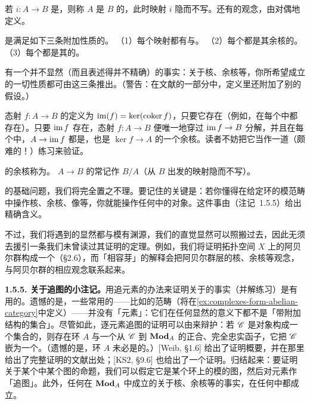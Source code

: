 若 $i\colon A\to B$ 是\trMonomorphism，则称 $A$ 是 $B$ 的\trSubobject，此时映射 $i$ 隐而不写。还有\trQuotientObject{}的观念，由\trSubobject{}对偶地定义。

\trAbelianCategory{}是满足如下三条附加性质的\trAdditiveCategory。
（1）每个映射都有\trKernel{}与\trCokernel。
（2）每个\trMonomorphism{}都是其余核的\trKernel。
（3）每个\trEpimorphism{}都是其\trKernel{}的\trCokernel。

有一个并不显然（而且表述得并不精确）的事实：关于核、余核等，你所希望成立的一切性质都可由这三条推出。（警告：在文献的一部分中，定义里还附加了别的假设。）

态射 $f\colon A\to B$ 的\trImage{}定义为 $\operatorname{im}(f)=\ker(\operatorname{coker} f)$，只要它存在（例如，在每个\trAbelianCategory{}中都存在）。只要 $\operatorname{im} f$ 存在，态射 $f\colon A\to B$ 便唯一地穿过 $\operatorname{im} f\to B$ 分解，并且在每个\trAbelianCategory{}中，$A\to\operatorname{im} f$ 都是\trEpimorphism，也是 $\ker f\to A$ 的一个余核。读者不妨把它当作一道（颇难的！）练习来验证。

\trMonomorphism{}的余核称为\trQuotient。\trMonomorphism{} $A\to B$ 的\trQuotient{}常记作 $B/A$（从 $B$ 出发的映射隐而不写）。

\trAbelianCategory{}的基础问题，我们将完全置之不理。要记住的关键是：若你懂得在给定环的模范畴中操作核、余核、像等，你就能操作任何\trAbelianCategory{}中的对象。这件事由\trFreydMitchellEmbeddingTheorem{}（注记~1.5.5）给出精确含义。

不过，我们将遇到的\trAbelianCategory{}显然都与模有渊源，我们的直觉显然可以照搬过去，因此无须去援引一条我们未曾读过其证明的定理。例如，我们将证明拓扑空间 $X$ 上的阿贝尔群\trSheaf{}构成一个\trAbelianCategory{}（\S2.6），而「相容芽」的解释会把阿贝尔群层的核、余核等观念，与阿贝尔群的相应观念联系起来。

\textbf{1.5.5. 关于追图的小注记。}\quad 用追元素的办法来证明关于\trAbelianCategory{}的事实（并解练习）是有用的。遗憾的是，一些常用的\trAbelianCategory——比如\trComplexes{}的范畴（将在\cref{ex:complexes-form-abelian-category}中定义）——并没有「元素」：它们在任何显然的意义下都不是「带附加结构的集合」。尽管如此，逐元素追图的证明可以由\trFreydMitchellEmbeddingTheorem{}来辩护：若 $\mathscr{C}$ 是对象构成一个集合的\trAbelianCategory，则存在环 $A$ 与一个从 $\mathscr{C}$ 到 $\mathbf{Mod}_{A}$ 的正合、完全忠实函子，它把 $\mathscr{C}$ 嵌为一个\trFullSubcategory。（遗憾的是，环 $A$ 未必是\trCommutative{}的。）[Weib, \S1.6] 给出了证明概要，并在那里给出了完整证明的文献出处；[KS2, \S9.6] 也给出了一个证明。归结起来：要证明关于某个\trAbelianCategory{}中某个图的命题，我们可以假定它是某个环上的模的图，然后对元素作「追图」。此外，任何在 $\mathbf{Mod}_{A}$ 中成立的关于核、余核等的事实，在任何\trAbelianCategory{}中都成立。

